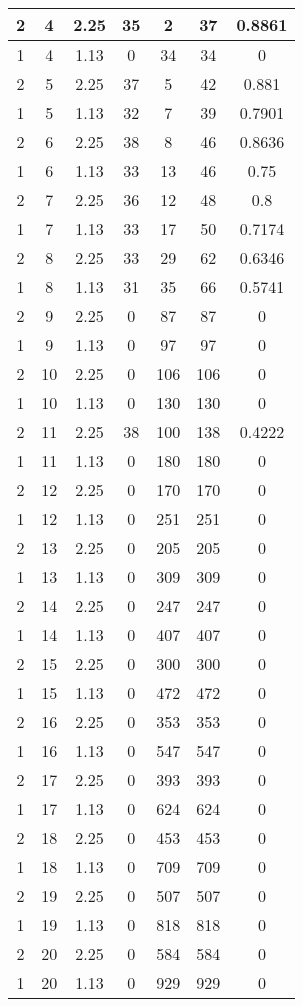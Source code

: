 \documentclass[letterpaper, 12pt]{article}
\begin{document}
\begin{longtable}{|c|c|c|c|c|c|c|}
\hline
2 & 4 & 2.25 & 35 & 2 & 37 & 0.8861 \\
\hline
1 & 4 & 1.13 & 0 & 34 & 34 & 0 \\
\hline
2 & 5 & 2.25 & 37 & 5 & 42 & 0.881 \\
\hline
1 & 5 & 1.13 & 32 & 7 & 39 & 0.7901 \\
\hline
2 & 6 & 2.25 & 38 & 8 & 46 & 0.8636 \\
\hline
1 & 6 & 1.13 & 33 & 13 & 46 & 0.75 \\
\hline
2 & 7 & 2.25 & 36 & 12 & 48 & 0.8 \\
\hline
1 & 7 & 1.13 & 33 & 17 & 50 & 0.7174 \\
\hline
2 & 8 & 2.25 & 33 & 29 & 62 & 0.6346 \\
\hline
1 & 8 & 1.13 & 31 & 35 & 66 & 0.5741 \\
\hline
2 & 9 & 2.25 & 0 & 87 & 87 & 0 \\
\hline
1 & 9 & 1.13 & 0 & 97 & 97 & 0 \\
\hline
2 & 10 & 2.25 & 0 & 106 & 106 & 0 \\
\hline
1 & 10 & 1.13 & 0 & 130 & 130 & 0 \\
\hline
2 & 11 & 2.25 & 38 & 100 & 138 & 0.4222 \\
\hline
1 & 11 & 1.13 & 0 & 180 & 180 & 0 \\
\hline
2 & 12 & 2.25 & 0 & 170 & 170 & 0 \\
\hline
1 & 12 & 1.13 & 0 & 251 & 251 & 0 \\
\hline
2 & 13 & 2.25 & 0 & 205 & 205 & 0 \\
\hline
1 & 13 & 1.13 & 0 & 309 & 309 & 0 \\
\hline
2 & 14 & 2.25 & 0 & 247 & 247 & 0 \\
\hline
1 & 14 & 1.13 & 0 & 407 & 407 & 0 \\
\hline
2 & 15 & 2.25 & 0 & 300 & 300 & 0 \\
\hline
1 & 15 & 1.13 & 0 & 472 & 472 & 0 \\
\hline
2 & 16 & 2.25 & 0 & 353 & 353 & 0 \\
\hline
1 & 16 & 1.13 & 0 & 547 & 547 & 0 \\
\hline
2 & 17 & 2.25 & 0 & 393 & 393 & 0 \\
\hline
1 & 17 & 1.13 & 0 & 624 & 624 & 0 \\
\hline
2 & 18 & 2.25 & 0 & 453 & 453 & 0 \\
\hline
1 & 18 & 1.13 & 0 & 709 & 709 & 0 \\
\hline
2 & 19 & 2.25 & 0 & 507 & 507 & 0 \\
\hline
1 & 19 & 1.13 & 0 & 818 & 818 & 0 \\
\hline
2 & 20 & 2.25 & 0 & 584 & 584 & 0 \\
\hline
1 & 20 & 1.13 & 0 & 929 & 929 & 0 \\
\hline
\end{longtable}
\end{document}
